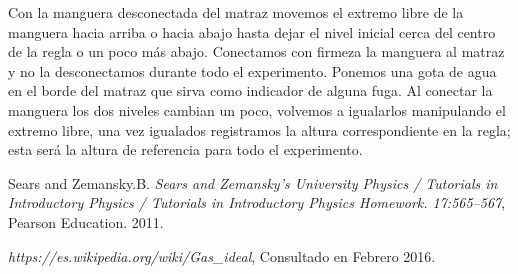\documentclass[DIV=calc, paper=a4, fontsize=11pt, twocolumn, spanish]{scrartcl}	 %
\begin{document}
Con la manguera desconectada del matraz movemos el extremo libre de la manguera hacia arriba o hacia abajo hasta dejar el nivel inicial cerca del centro de la regla o un poco más abajo. Conectamos con firmeza la manguera al matraz y no la desconectamos durante todo el experimento. Ponemos una gota de agua en el borde del matraz que sirva como indicador de alguna fuga. Al conectar la manguera los dos niveles cambian un poco, volvemos a igualarlos manipulando el extremo libre, una vez igualados registramos la altura correspondiente en la regla; esta será la altura de referencia para todo el experimento.\\


\begin{thebibliography}{99} %

   Sears and Zemansky.B. {\em Sears and Zemansky's University Physics / Tutorials in Introductory Physics / Tutorials in Introductory Physics Homework. 17:565--567}, Pearson Education.  2011.
  
   \textit{https://es.wikipedia.org/wiki/Gas\_ideal}, Consultado en Febrero 2016.
 
\end{thebibliography}

\end{document}
